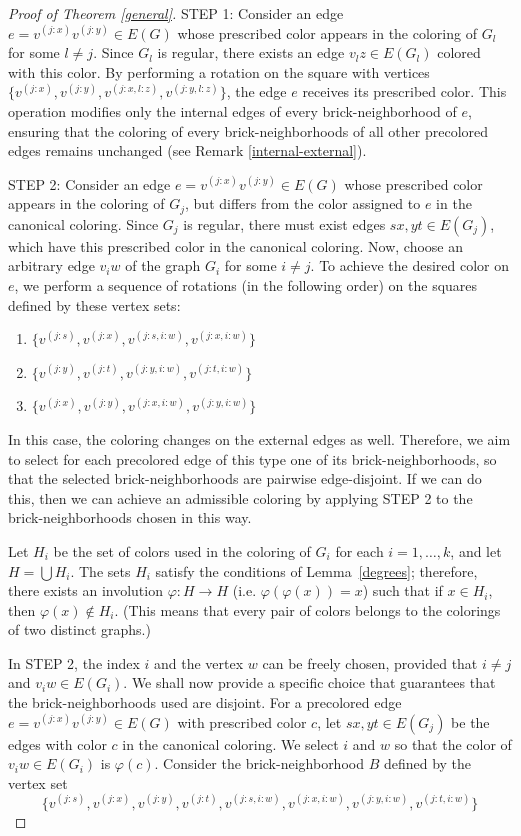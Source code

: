 \documentclass[a4paper,12pt]{article}
\begin{document}
\begin{proof}[Proof of Theorem \ref{general}]
    STEP 1: Consider an edge $e = v^{(j:x)}v^{(j:y)} \in E(G)$ whose prescribed color appears in the coloring of $G_l$ for some $l \neq j$. Since $G_l$ is regular, there exists an edge $v_lz \in E(G_l)$ colored with this color. By performing a rotation on the square with vertices $\{v^{(j:x)}, v^{(j:y)}, v^{(j:x,l:z)}, v^{(j:y,l:z)}\}$, the edge $e$ receives its prescribed color. This operation modifies only the internal edges of every brick-neighborhood of $e$, ensuring that the coloring of every brick-neighborhoods of all other precolored edges remains unchanged (see Remark \ref{internal-external}).

    STEP 2: Consider an edge $e = v^{(j:x)}v^{(j:y)} \in E(G)$ whose prescribed color appears in the coloring of $G_j$, but differs from the color assigned to $e$ in the canonical coloring. Since $G_j$ is regular, there must exist edges $sx, yt \in E(G_j)$, which have this prescribed color in the canonical coloring. Now, choose an arbitrary edge $v_iw$ of the graph $G_i$ for some $i \neq j$. To achieve the desired color on $e$, we perform a sequence of rotations (in the following order) on the squares defined by these vertex sets:
    \begin{enumerate}
        \item $\{v^{(j:s)}, v^{(j:x)}, v^{(j:s,i:w)}, v^{(j:x,i:w)}\}$
        \item $\{v^{(j:y)}, v^{(j:t)}, v^{(j:y,i:w)}, v^{(j:t,i:w)}\}$
        \item $\{v^{(j:x)}, v^{(j:y)}, v^{(j:x,i:w)}, v^{(j:y,i:w)}\}$
    \end{enumerate}

    In this case, the coloring changes on the external edges as well. Therefore, we aim to select for each precolored edge of this type one of its brick-neighborhoods, so that the selected brick-neighborhoods are pairwise edge-disjoint. If we can do this, then we can achieve an admissible coloring by applying STEP 2 to the brick-neighborhoods chosen in this way.

    Let $H_i$ be the set of colors used in the coloring of $G_i$ for each $i = 1, \dots, k$, and let $H = \bigcup H_i$. The sets $H_i$ satisfy the conditions of Lemma~\ref{degrees}; therefore, there exists an involution $\varphi: H \to H$ (i.e. $\varphi(\varphi(x))=x$) such that if $x \in H_i$, then $\varphi(x) \notin H_i$. (This means that every pair of colors belongs to the colorings of two distinct graphs.)
    
    In STEP 2, the index $i$ and the vertex $w$ can be freely chosen, provided that $i \neq j$ and $v_iw \in E(G_i)$. We shall now provide a specific choice that guarantees that the brick-neighborhoods used are disjoint. For a precolored edge $e = v^{(j:x)}v^{(j:y)} \in E(G)$ with prescribed color $c$, let $sx, yt \in E(G_j)$ be the edges with color $c$ in the canonical coloring. We select $i$ and $w$ so that the color of $v_iw \in E(G_i)$ is $\varphi(c)$. Consider the brick-neighborhood $B$ defined by the vertex set $$\{v^{(j:s)}, v^{(j:x)}, v^{(j:y)}, v^{(j:t)}, v^{(j:s, i:w)}, v^{(j:x, i:w)}, v^{(j:y, i:w)}, v^{(j:t, i:w)}\}$$ 
    

\end{proof}
\end{document}
